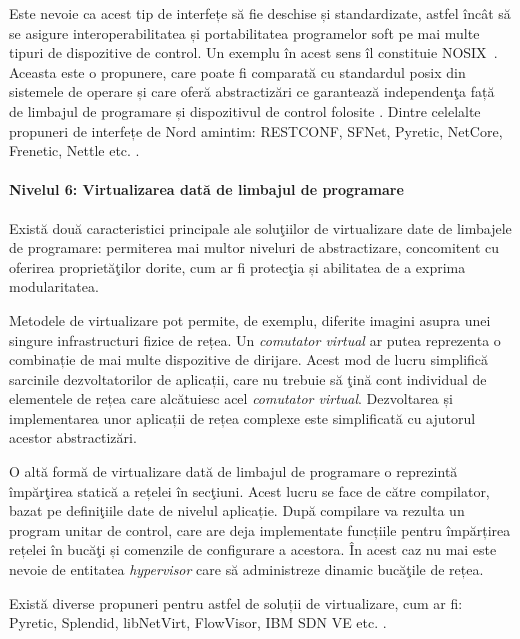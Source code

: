 Este nevoie ca acest tip de interfețe să fie deschise și standardizate, astfel încât să se asigure interoperabilitatea și portabilitatea programelor soft pe mai multe tipuri de dispozitive de control. Un exemplu în acest sens îl constituie NOSIX~\cite{wundsam2012nosix}. Aceasta este o propunere, care poate fi comparată cu standardul \gls{posix} din sistemele de operare și care oferă abstractizări ce garantează independenţa față de limbajul de programare și dispozitivul de control folosite \cite{barney2009posix}. Dintre celelalte propuneri de interfețe de Nord amintim: RESTCONF, SFNet, Pyretic, NetCore, Frenetic, Nettle etc. \cite{bierman2017restconf, yap2010towards, reich2013modular, monsanto2012compiler}.

\paragraph{Nivelul 6: Virtualizarea dată de limbajul de programare}

Există două caracteristici principale ale soluţiilor de virtualizare date de limbajele de programare: permiterea mai multor niveluri de abstractizare, concomitent cu oferirea proprietăţilor dorite, cum ar fi protecţia și abilitatea de a exprima modularitatea.

Metodele de virtualizare pot permite, de exemplu, diferite imagini asupra unei singure infrastructuri fizice de rețea. Un \textit{comutator virtual} ar putea reprezenta o combinație de mai multe dispozitive de dirijare. Acest mod de lucru simplifică sarcinile dezvoltatorilor de aplicații, care nu trebuie să ţină cont individual de elementele de rețea care alcătuiesc acel \textit{comutator virtual}. Dezvoltarea și implementarea unor aplicații de rețea complexe este simplificată cu ajutorul acestor abstractizări.

O altă formă de virtualizare dată de limbajul de programare o reprezintă împărţirea statică a rețelei în secţiuni. Acest lucru se face de către compilator, bazat pe definiţiile date de nivelul aplicație. După compilare va rezulta un program unitar de control, care are deja implementate funcțiile pentru împărțirea rețelei în bucăţi și comenzile de configurare a acestora. În acest caz nu mai este nevoie de entitatea \textit{hypervisor} care să administreze dinamic bucăţile de rețea.

Există diverse propuneri pentru astfel de soluții de virtualizare, cum ar fi: Pyretic, Splendid, libNetVirt, FlowVisor, IBM SDN VE etc. \cite{reich2013modular, schlesinger2012splendid, turull2012libnetvirt, sherwood2009flowvisor}.

